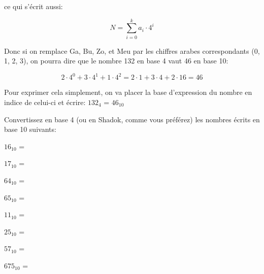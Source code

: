 \documentclass[12pt]{article}
\begin{document}
	ce qui s'écrit aussi:
	
	\[ N = \sum_{i=0}^{k} a_i \cdot 4^i \]
	
	Donc si on remplace Ga, Bu, Zo, et Meu par les chiffres arabes correspondants (0, 1, 2, 3), on pourra dire que le nombre 132 en base 4 vaut 46 en base 10:
	
	\[ 2 \cdot 4^0 + 3 \cdot 4^1 + 1 \cdot 4^2  = 2 \cdot 1 + 3 \cdot 4 + 2 \cdot 16 = 46\]
	
	Pour exprimer cela simplement, on va placer la base d'expression du nombre en indice de celui-ci et écrire: $132_4$ = $46_{10}$
	
	\begin{MonExo}
		Convertissez en base 4 (ou en Shadok, comme vous préférez) les nombres écrits en base 10 suivants:
		\begin{alphenum}
			\item $16_{10}$ =
			\item $17_{10}$ =
			\item $64_{10}$ =
			\item $65_{10}$ =
			\item $11_{10}$ =
			\item $25_{10}$ =
			\item $57_{10}$ =
			\item $675_{10}$ =
		\end{alphenum}
	\end{MonExo}
	
\end{document}
